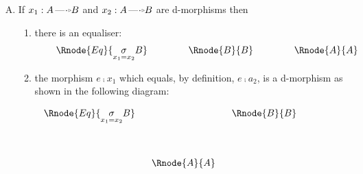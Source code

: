 \documentclass[10pt,a4paper]{scrartcl}
\begin{document}
\begin{enumerate} [A.,leftmargin=0.5cm]
\noindent then
$B_2[x_1|x_2]=B_1[x_2|x_1] = \fibrex{B_1}{B_2}{D}$ and $q(x_1,x_2)= x_2\sub x_1 $ and $q(x_2,x_1)= x_1 \sub x_2$
\noindent
so that we have:

\begin{center}
$
\begin{array}{cp{0cm}cp{0cm}c}
               && \Rnode{X}{\fibrex{x_1}{x_2}{D}}&&                \\ [1.2cm]
\Rnode{B1}{B_1}&&                                && \Rnode{B2}{B_2} \\ [1.2cm]
               &&\Rnode{A}{A}                    && 
\end{array}
$
\end{center}

\item {} If
$x_1:A \dmorph B$ and $x_2:A \dmorph B$ are d-morphisms then 

\begin{enumerate}[label*=\arabic*]
\item
{}
there is an equaliser: \\

$$
\setlength{\arraycolsep}{.75cm}
\begin{array}{ccc}
\Rnode{Eq}{\underset{x_1=x_2}{\sigma}B} & \Rnode{B}{B}  & \Rnode{A}{A} \\
\end{array}
$$
\setlength{\saroffsetA}{4pt}
\setlength{\saroffsetB}{4pt}
\setlength{\saroffsetA}{-4pt}
\setlength{\saroffsetB}{-4pt}
\sarreset

\item
{}
 the morphism $e \comp x_1$ which equals, by definition, $e \comp a_2$,  is a d-morphism as shown
in the following diagram:
\vspace{.2cm}
\begin{center}
$
\setlength{\arraycolsep}{.3cm}
\begin{array}{ccc}
\Rnode{Eq}{\underset{x_1=x_2}{\sigma}B} & &\Rnode{B}{B} \\[1.4cm]
 & \Rnode{A}{A} &\\
\end{array}
$

\setlength{\saroffsetA}{4pt}
\setlength{\saroffsetB}{4pt}
\setlength{\saroffsetA}{-4pt}
\setlength{\saroffsetB}{-4pt}
\sarreset
\end{center}
  

\end{enumerate}
\end{enumerate}
\end{document}
